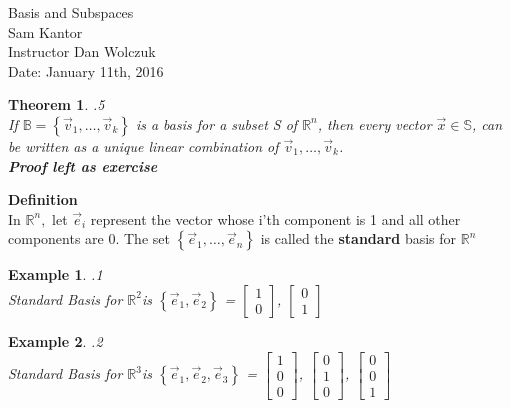 \documentclass{letter}
\newcounter{Theorem}
\newtheorem{theorem}{Theorem}[Theorem]
\newtheorem{example}{Example}[Theorem]
\begin{document}

\begin{center}
\Huge{Basis and Subspaces} \\
\large{Sam Kantor \\ Instructor Dan Wolczuk} \\
\large{Date: January 11th, 2016}
\end{center}

\begin{theorem} .5\\
If $\mathbb{B} = \left\lbrace \vec {v}_1, \ldots, \vec{v}_k \right\rbrace$ is a basis for a subset S of $\mathbb{R}^n$, then every vector $\vec{x} \in \mathbb{S}$, can be written as a unique linear combination of $\vec {v}_1, \ldots, \vec{v}_k$. \\
\textbf{Proof left as exercise} \\

\end{theorem}

\textbf{Definition} \\
In $\mathbb{R}^n, $ let $\vec{e}_i$ represent the vector whose i'th component is 1 and all other components are 0. The set $\left\lbrace \vec {e}_1, \ldots, \vec{e}_n \right\rbrace$ is called the \textbf{standard} basis for $\mathbb{R}^n$ \\

\begin{example} .1 \\
Standard Basis for $\mathbb{R}^2 $is $\left\lbrace \vec {e}_1, \vec{e}_2 \right\rbrace $ = 
$ \left [\begin{matrix}
    1 \\ 0
\end{matrix}\right]$,
$\left[\begin{matrix}
    0 \\ 1
\end{matrix}\right]$

\end{example}

\begin{example} .2 \\
Standard Basis for $\mathbb{R}^3 $is $\left\lbrace \vec {e}_1, \vec{e}_2, \vec{e}_3 \right\rbrace $ = 
$ \left [\begin{matrix}
    1 \\ 0 \\ 0
\end{matrix}\right]$,
$ \left [\begin{matrix}
    0 \\ 1 \\ 0
\end{matrix}\right]$,
$ \left [\begin{matrix}
    0 \\ 0 \\ 1
\end{matrix}\right]$
\end{example}
\end{document}
